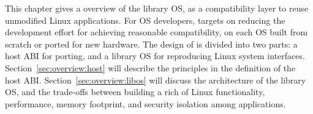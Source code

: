 This chapter gives a overview of the \graphene{} library OS, as a compatibility layer to reuse unmodified Linux applications. For OS developers, \graphene{} targets on reducing the development effort for achieving reasonable compatibility,
on each OS built from scratch or ported for new hardware.
The design of \graphene{} is divided into two parts: a host ABI for porting, and a library OS for reproducing Linux system interfaces.
Section~\ref{sec:overview:host} will describe the principles in the definition of the host ABI. 
Section~\ref{sec:overview:libos} will discuss the architecture of the library OS,
and the trade-offs between building a rich of Linux functionality, performance, memory footprint, and security isolation among applications.

